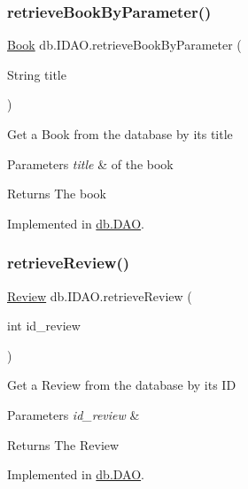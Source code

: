 \subsubsection{\texorpdfstring{retrieve\+Book\+By\+Parameter()}{retrieveBookByParameter()}}
{\footnotesize\ttfamily \hyperlink{classserver_1_1data_1_1_book}{Book} db.\+I\+D\+A\+O.\+retrieve\+Book\+By\+Parameter (\begin{DoxyParamCaption}\item[{String}]{title }\end{DoxyParamCaption})}

Get a Book from the database by its title 
\begin{DoxyParams}{Parameters}
{\em title} & of the book \\
\hline
\end{DoxyParams}
\begin{DoxyReturn}{Returns}
The book 
\end{DoxyReturn}


Implemented in \hyperlink{classdb_1_1_d_a_o_a1f8580da682f8a8af4896c491c3b6611}{db.\+D\+AO}.

\mbox{\label{interfacedb_1_1_i_d_a_o_a53fd20610d94f7c5f0f713dad7528c26}} 
\subsubsection{\texorpdfstring{retrieve\+Review()}{retrieveReview()}}
{\footnotesize\ttfamily \hyperlink{classserver_1_1data_1_1_review}{Review} db.\+I\+D\+A\+O.\+retrieve\+Review (\begin{DoxyParamCaption}\item[{int}]{id\+\_\+review }\end{DoxyParamCaption})}

Get a Review from the database by its ID 
\begin{DoxyParams}{Parameters}
{\em id\+\_\+review} & \\
\hline
\end{DoxyParams}
\begin{DoxyReturn}{Returns}
The Review 
\end{DoxyReturn}


Implemented in \hyperlink{classdb_1_1_d_a_o_ae43e182fae8ee7028db6ff17c2d5768f}{db.\+D\+AO}.

